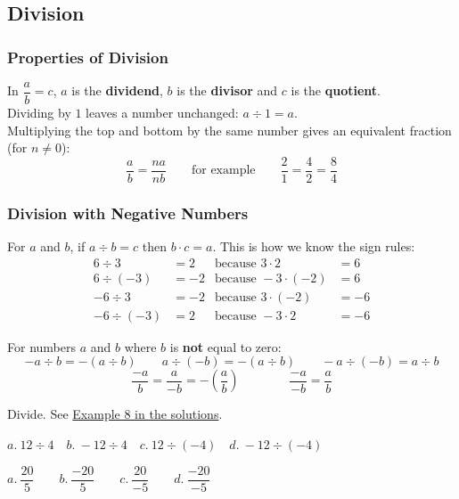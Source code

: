 \documentclass[letter]{article}
\newenvironment{keybox}
  {\begin{lrbox}{\keyboxsave}\begin{minipage}{\dimexpr\linewidth-2\fboxsep-2\fboxrule\relax}}
  {\end{minipage}\end{lrbox}\par\noindent\fbox{\usebox{\keyboxsave}}\par}
\newcommand{\exbox}[1]{\fbox{\textbf{Example #1}}}
\newcommand{\chp}{}
\newcommand{\seesol}[1]{See \hyperref[sec:\chp ex#1]{Example #1 in the solutions}.}
\begin{document}
\subsection{Division}

\subsubsection*{Properties of Division}

\begin{keybox}
In $\dfrac ab=c$, $a$ is the \textbf{dividend}, $b$ is the \textbf{divisor} and $c$ is the \textbf{quotient}.\\[6pt]
Dividing by $1$ leaves a number unchanged: $a\div1=a$.\\[6pt]
Multiplying the top and bottom by the same number gives an equivalent fraction (for $n\neq0$):
\[\frac ab=\frac{na}{nb}\qquad\text{for example}\qquad\frac21=\frac42=\frac84\]
\end{keybox}

\subsubsection*{Division with Negative Numbers}

For $a$ and $b$, if $a\div b=c$ then $b\cdot c=a$. This is how we know the sign rules:
\begin{align*}
  6\div3&=2&\text{because }3\cdot2&=6\\
  6\div(-3)&=-2&\text{because }-3\cdot(-2)&=6\\
  -6\div3&=-2&\text{because }3\cdot(-2)&=-6\\
  -6\div(-3)&=2&\text{because }-3\cdot2&=-6
\end{align*}

\begin{keybox}
For numbers $a$ and $b$ where $b$ is \textbf{not} equal to zero:
\[-a\div b=-(a\div b)\qquad a\div(-b)=-(a\div b)\qquad-a\div(-b)=a\div b\]
\[\frac{-a}b=\frac a{-b}=-\left(\frac ab\right)\qquad\qquad\frac{-a}{-b}=\frac ab\]
\end{keybox}

\exbox{8} Divide. \seesol{8}
\begin{center}
$a.\ 12\div4\quad b.\ -12\div4\quad c.\ 12\div(-4)\quad d.\ -12\div(-4)$
\end{center}
\begin{center}
$a.\ \dfrac{20}5\qquad b.\ \dfrac{-20}5\qquad c.\ \dfrac{20}{-5}\qquad d.\ \dfrac{-20}{-5}$
\end{center}
\end{document}
